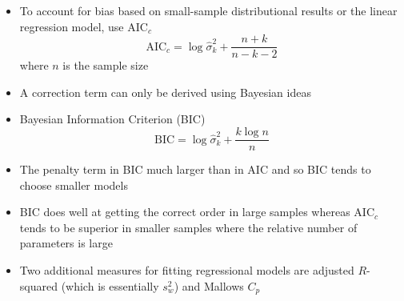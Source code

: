 \documentclass[12pt]{article}
\begin{document}
\begin{itemize}
\item To account for bias based on small-sample distributional results or the linear regression model, use $\text{AIC}_c$ $$ \text{AIC}_c = \log \hat{\sigma}^2_k + \frac{n+k}{n-k-2} $$ where $n$ is the sample size 
\item A correction term can only be derived using Bayesian ideas 
\item Bayesian Information Criterion (BIC) $$ \text{BIC} = \log \hat{\sigma}^2_k + \frac{k \log n}{n} $$ 
\item The penalty term in BIC much larger than in AIC and so BIC tends to choose smaller models 
\item BIC does well at getting the correct order in large samples whereas $\text{AIC}_c$ tends to be superior in smaller samples where the relative number of parameters is large
\item Two additional measures for fitting regressional models are adjusted $R$-squared (which is essentially $s_w^2$) and Mallows $C_p$
\end{itemize}
\end{document}
